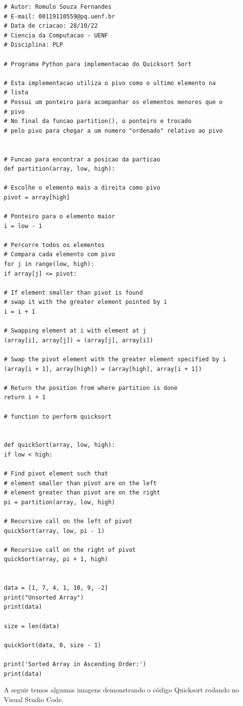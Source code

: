\begin{lstlisting}
# Autor: Romulo Souza Fernandes
# E-mail: 00119110559@pq.uenf.br
# Data de criacao: 28/10/22
# Ciencia da Computacao - UENF
# Disciplina: PLP

# Programa Python para implementacao do Quicksort Sort

# Esta implementacao utiliza o pivo como o ultimo elemento na 
# lista
# Possui um ponteiro para acompanhar os elementos menores que o 
# pivo
# No final da funcao partition(), o ponteiro e trocado 
# pelo pivo para chegar a um numero "ordenado" relativo ao pivo


# Funcao para encontrar a posicao da particao
def partition(array, low, high):

# Escolhe o elemento mais a direita como pivo
pivot = array[high]

# Ponteiro para o elemento maior
i = low - 1

# Percorre todos os elementos
# Compara cada elemento com pivo
for j in range(low, high):
if array[j] <= pivot:

# If element smaller than pivot is found
# swap it with the greater element pointed by i
i = i + 1

# Swapping element at i with element at j
(array[i], array[j]) = (array[j], array[i])

# Swap the pivot element with the greater element specified by i
(array[i + 1], array[high]) = (array[high], array[i + 1])

# Return the position from where partition is done
return i + 1

# function to perform quicksort


def quickSort(array, low, high):
if low < high:

# Find pivot element such that
# element smaller than pivot are on the left
# element greater than pivot are on the right
pi = partition(array, low, high)

# Recursive call on the left of pivot
quickSort(array, low, pi - 1)

# Recursive call on the right of pivot
quickSort(array, pi + 1, high)


data = [1, 7, 4, 1, 10, 9, -2]
print("Unsorted Array")
print(data)

size = len(data)

quickSort(data, 0, size - 1)

print('Sorted Array in Ascending Order:')
print(data)
\end{lstlisting}
	A seguir temos algumas imagens demonstrando o código Quicksort rodando no Visual Studio Code.
	
